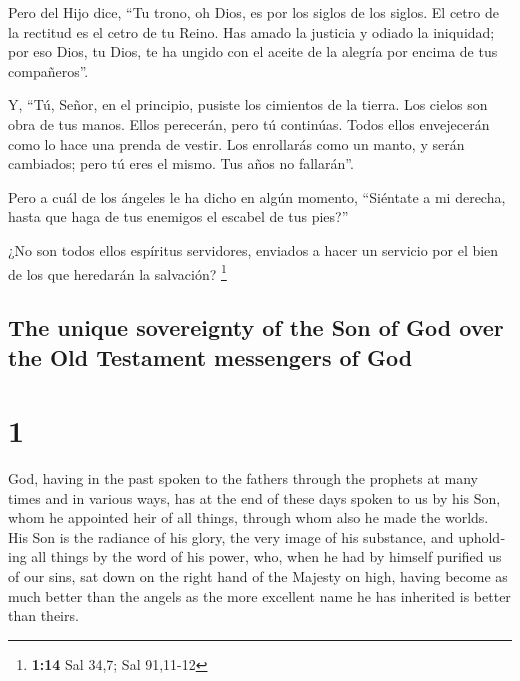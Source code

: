 \begin{paracol}{2}
 Pero del Hijo dice, ``Tu trono, oh Dios, es por los
siglos de los siglos. El cetro de la rectitud es el cetro de tu Reino.
 Has amado la justicia y odiado la iniquidad; por eso
Dios, tu Dios, te ha ungido con el aceite de la alegría por encima de
tus compañeros''.

 Y, ``Tú, Señor, en el principio, pusiste los cimientos
de la tierra. Los cielos son obra de tus manos.  Ellos
perecerán, pero tú continúas. Todos ellos envejecerán como lo hace una
prenda de vestir.  Los enrollarás como un manto, y serán
cambiados; pero tú eres el mismo. Tus años no fallarán''.

 Pero a cuál de los ángeles le ha dicho en algún momento,
``Siéntate a mi derecha, hasta que haga de tus enemigos el escabel de
tus pies?''

 ¿No son todos ellos espíritus servidores, enviados a
hacer un servicio por el bien de los que heredarán la salvación?
\footnote{\textbf{1:14} Sal 34,7; Sal 91,11-12}

\switchcolumn
\begin{otherlanguage}{english}

\hypertarget{the-unique-sovereignty-of-the-son-of-god-over-the-old-testament-messengers-of-god}{%
\subsection{The unique sovereignty of the Son of God over the Old
Testament messengers of
God}\label{the-unique-sovereignty-of-the-son-of-god-over-the-old-testament-messengers-of-god}}

\hypertarget{section-1}{%
\section{1}\label{section-1}}

 God, having in the past spoken to the fathers through the
prophets at many times and in various ways,  has at the
end of these days spoken to us by his Son, whom he appointed heir of all
things, through whom also he made the worlds.  His Son is
the radiance of his glory, the very image of his substance, and
upholding all things by the word of his power, who, when he had by
himself purified us of our sins, sat down on the right hand of the
Majesty on high,  having become as much better than the
angels as the more excellent name he has inherited is better than
theirs.


\end{otherlanguage}
\end{paracol}

